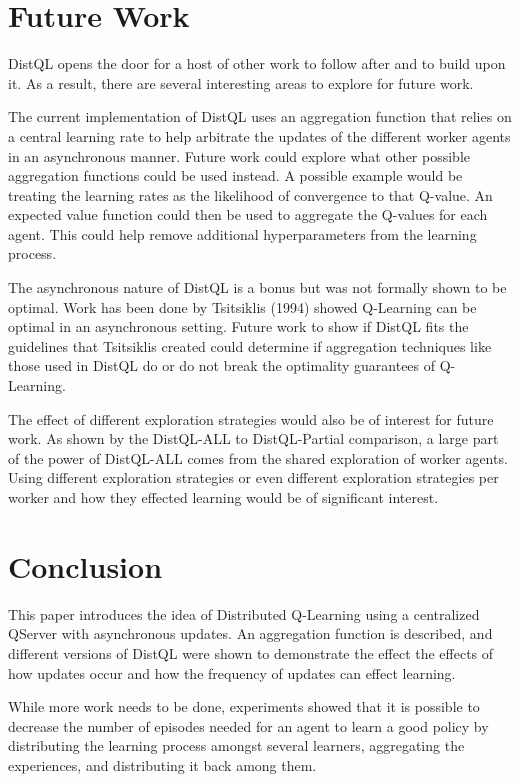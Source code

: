 \documentclass[jair,twoside,11pt,theapa]{article}
\begin{document}

\section{Future Work}
\label{future}
DistQL opens the door for a host of other work to follow after and to build upon it. As a result, there are several interesting areas to explore for future work. 

The current implementation of DistQL uses an aggregation function that relies on a central learning rate to help arbitrate the updates of the different worker agents in an asynchronous manner. Future work could explore what other possible aggregation functions could be used instead. A possible example would be treating the learning rates as the likelihood of convergence to that Q-value. An expected value function could then be used to aggregate the Q-values for each agent. This could help remove additional hyperparameters from the learning process.

The asynchronous nature of DistQL is a bonus but was not formally shown to be optimal. Work has been done by Tsitsiklis (1994) \nocite{Tsitsiklis1994} showed Q-Learning can be optimal in an asynchronous setting. Future work to show if DistQL fits the guidelines that Tsitsiklis created could determine if aggregation techniques like those used in DistQL do or do not break the optimality guarantees of Q-Learning. 

The effect of different exploration strategies would also be of interest for future work. As shown by the DistQL-ALL to DistQL-Partial comparison, a large part of the power of DistQL-ALL comes from the shared exploration of worker agents. Using different exploration strategies or even different exploration strategies per worker and how they effected learning would be of significant interest. 

\section{Conclusion}
\label{conclusion}
This paper introduces the idea of Distributed Q-Learning using a centralized QServer with asynchronous updates. An aggregation function is described, and different versions of DistQL were shown to demonstrate the effect the effects of how updates occur and how the frequency of updates can effect learning. 

While more work needs to be done, experiments showed that it is possible to decrease the number of episodes needed for an agent to learn a good policy by distributing the learning process amongst several learners, aggregating the experiences, and distributing it back among them.

\vskip 0.2in


\end{document}
